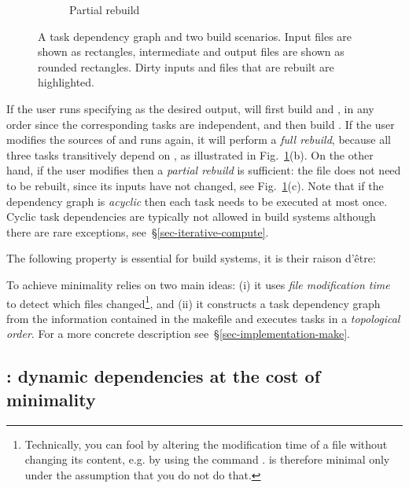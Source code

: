 \begin{figure}[h]
\begin{subfigure}[b]{0.32\linewidth}
\caption{Partial rebuild}
\end{subfigure}
\caption{A task dependency graph and two build scenarios. Input files are shown as
rectangles, intermediate and output files are shown as rounded rectangles. Dirty
inputs and files that are rebuilt are highlighted.
\label{fig-make}}
\end{figure}

If the user runs \Make specifying  as the desired output, \Make
will first build  and , in any order since the
corresponding tasks are independent, and then build . If the
user modifies the sources of  and runs \Make again, it will
perform a \emph{full rebuild}, because all three tasks transitively depend on
, as illustrated in Fig.~\ref{fig-make}(b). On the other hand, if
the user modifies  then a \emph{partial rebuild} is sufficient:
the file  does not need to be rebuilt, since its inputs have not
changed, see Fig.~\ref{fig-make}(c). Note that if the dependency graph is
\emph{acyclic} then each task needs to be executed at most once. Cyclic task
dependencies are typically not allowed in build systems although there are rare
exceptions, see~\S\ref{sec-iterative-compute}.

The following property is essential for build systems, it is their raison d'\^etre:

\label{def-minimal}
\vspace{2mm}

To achieve minimality \Make relies on two main ideas: (i) it uses \emph{file
modification time} to detect which files changed\footnote{Technically, you
can fool \Make by altering the modification time of a file without changing its
content, e.g. by using the command . \Make is therefore minimal only
under the assumption that you do not do that.}, and (ii) it constructs a task
dependency graph from the information contained in the makefile and executes
tasks in a \emph{topological order}. For a more concrete description
see~\S\ref{sec-implementation-make}.

\subsection{\Excel: dynamic dependencies at the cost of minimality}
\label{sec-background-excel}


